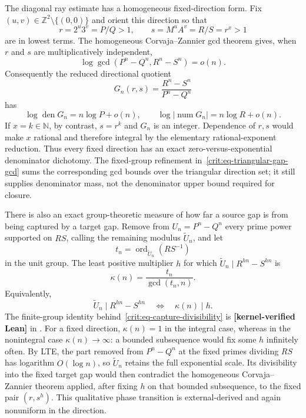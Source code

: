 \documentclass[11pt,oneside]{article}
\theoremstyle{definition}
\theoremstyle{remark}
\newcommand{\N}{\mathbb N}
\newcommand{\Z}{\mathbb Z}
\newcommand{\lean}[1]{\texttt{\detokenize{#1}}}
\newcommand{\statuslean}{\textcolor{leanblue}{\textbf{[kernel-verified Lean]}}}
\begin{document}
The diagonal ray estimate has a homogeneous fixed-direction form.  Fix
$(u,v)\in\Z^2\setminus\{(0,0)\}$ and orient this direction so that
\[
 r=2^u3^v=P/Q>1,\qquad s=M^uA^v=R/S=r^x>1
\]
are in lowest terms.  The homogeneous Corvaja--Zannier gcd theorem gives, when $r$ and $s$
are multiplicatively independent,
\begin{equation}
 \log\gcd(P^n-Q^n,R^n-S^n)=o(n).
 \label{crit:eq-homogeneous-gap-gcd}
\end{equation}
Consequently the reduced directional quotient
\begin{equation}
 G_n(r,s)=\frac{R^n-S^n}{P^n-Q^n}
 \label{crit:eq-directional-gap-quotient}
\end{equation}
has
\begin{equation}
 \log\operatorname{den}G_n=n\log P+o(n),\qquad
 \log|\operatorname{num}G_n|=n\log R+o(n).
 \label{crit:eq-directional-gap-height}
\end{equation}
If $x=k\in\N$, by contrast, $s=r^k$ and $G_n$ is an integer.  Dependence of $r,s$
would make $x$ rational and therefore integral by the elementary rational-exponent
reduction.  Thus every fixed direction has an exact zero-versus-exponential denominator
dichotomy.  The fixed-group refinement in~\eqref{crit:eq-triangular-gap-gcd} sums the
corresponding gcd bounds over the triangular direction set; it still supplies denominator
mass, not the denominator upper bound required for closure.

There is also an exact group-theoretic measure of how far a source gap is from being
captured by a target gap.  Remove from $U_n=P^n-Q^n$ every prime power supported on $RS$,
calling the remaining modulus $\widetilde U_n$, and let
\[
 t_n=\operatorname{ord}_{\widetilde U_n}(RS^{-1})
\]
in the unit group.  The least positive multiplier $h$ for which
$\widetilde U_n\mid R^{hn}-S^{hn}$ is
\begin{equation}
 \boxed{\kappa(n)=\frac{t_n}{\gcd(t_n,n)}.}
 \label{crit:eq-capture-multiplier}
\end{equation}
Equivalently,
\begin{equation}
 \widetilde U_n\mid R^{hn}-S^{hn}
 \quad\Longleftrightarrow\quad \kappa(n)\mid h.
 \label{crit:eq-capture-divisibility}
\end{equation}
The finite-group identity behind~\eqref{crit:eq-capture-divisibility} is
\statuslean{} in \lean{CaptureMultiplier}.  For a fixed direction, $\kappa(n)=1$ in
the integral case, whereas in the nonintegral case $\kappa(n)\to\infty$: a bounded
subsequence would fix some $h$ infinitely often.  By LTE, the part removed from
$P^n-Q^n$ at the fixed primes dividing $RS$ has logarithm $O(\log n)$, so
$\widetilde U_n$ retains the full exponential scale.  Its divisibility into the fixed
target gap would then contradict the homogeneous Corvaja--Zannier theorem applied, after
fixing $h$ on that bounded subsequence, to the fixed pair $(r,s^h)$.  This qualitative
phase transition is external-derived and again nonuniform in the direction.
\end{document}

